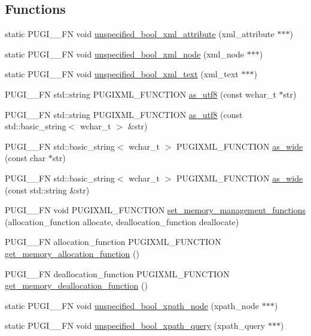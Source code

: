 \subsection*{Functions}
\begin{DoxyCompactItemize}
\item 
static PUGI\_\-\_\-FN void \hyperlink{namespacepugi_a8effe3a6fc7cc9c1cf2550739dbdc438}{unspecified\_\-bool\_\-xml\_\-attribute} (xml\_\-attribute $\ast$$\ast$$\ast$)
\item 
static PUGI\_\-\_\-FN void \hyperlink{namespacepugi_a487b2e720a3808d6fd5730d7c97bcdac}{unspecified\_\-bool\_\-xml\_\-node} (xml\_\-node $\ast$$\ast$$\ast$)
\item 
static PUGI\_\-\_\-FN void \hyperlink{namespacepugi_acfae514de3abac05ed155e531a401c15}{unspecified\_\-bool\_\-xml\_\-text} (xml\_\-text $\ast$$\ast$$\ast$)
\item 
PUGI\_\-\_\-FN std::string PUGIXML\_\-FUNCTION \hyperlink{namespacepugi_a390bb44f7ba92b1a8a4f9157799d2ca8}{as\_\-utf8} (const wchar\_\-t $\ast$str)
\item 
PUGI\_\-\_\-FN std::string PUGIXML\_\-FUNCTION \hyperlink{namespacepugi_ab4be9ab3dc86b13599b9f2fd2f778dfb}{as\_\-utf8} (const std::basic\_\-string$<$ wchar\_\-t $>$ \&str)
\item 
PUGI\_\-\_\-FN std::basic\_\-string$<$ wchar\_\-t $>$ PUGIXML\_\-FUNCTION \hyperlink{namespacepugi_ac2a9782a1c3c725703c6e4533e735d9b}{as\_\-wide} (const char $\ast$str)
\item 
PUGI\_\-\_\-FN std::basic\_\-string$<$ wchar\_\-t $>$ PUGIXML\_\-FUNCTION \hyperlink{namespacepugi_af33046c0db1ff7b3f63327d32fc6dca7}{as\_\-wide} (const std::string \&str)
\item 
PUGI\_\-\_\-FN void PUGIXML\_\-FUNCTION \hyperlink{namespacepugi_a993c6b7947c1dec98936510d9e5fe778}{set\_\-memory\_\-management\_\-functions} (allocation\_\-function allocate, deallocation\_\-function deallocate)
\item 
PUGI\_\-\_\-FN allocation\_\-function PUGIXML\_\-FUNCTION \hyperlink{namespacepugi_ab36e5aed4e5c952687b42d69daf981eb}{get\_\-memory\_\-allocation\_\-function} ()
\item 
PUGI\_\-\_\-FN deallocation\_\-function PUGIXML\_\-FUNCTION \hyperlink{namespacepugi_a9fcabe4b52fbef0f133fab9ff97652ca}{get\_\-memory\_\-deallocation\_\-function} ()
\item 
static PUGI\_\-\_\-FN void \hyperlink{namespacepugi_abca519e72b848d2ebadf5250727da6c5}{unspecified\_\-bool\_\-xpath\_\-node} (xpath\_\-node $\ast$$\ast$$\ast$)
\item 
static PUGI\_\-\_\-FN void \hyperlink{namespacepugi_a41b925609dde7657664cf68c6506838b}{unspecified\_\-bool\_\-xpath\_\-query} (xpath\_\-query $\ast$$\ast$$\ast$)
\end{DoxyCompactItemize}


